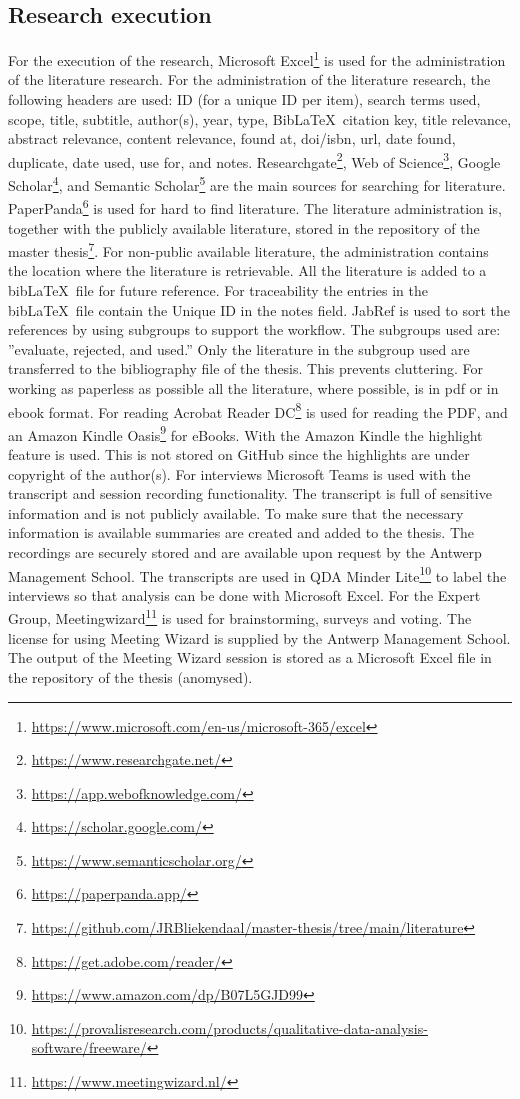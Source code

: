 \subsection{Research execution}
\label{sub:tbresearchexecution}
For the execution of the research, Microsoft Excel\footnote{\url{https://www.microsoft.com/en-us/microsoft-365/excel}} is used for the administration of the literature research. For the administration of the literature research, the following headers are used: ID (for a unique ID per item), search terms used, scope, title, subtitle, author(s), year, type, Bib\LaTeX\ citation key, title relevance, abstract relevance, content relevance, found at, doi/isbn, url, date found, duplicate, date used, use for, and notes. Researchgate\footnote{\url{https://www.researchgate.net/}}, Web of Science\footnote{\url{https://app.webofknowledge.com/}}, Google Scholar\footnote{\url{https://scholar.google.com/}}, and Semantic Scholar\footnote{\url{https://www.semanticscholar.org/}} are the main sources for searching for literature. PaperPanda\footnote{\url{https://paperpanda.app/}} is used for hard to find literature. The literature administration is, together with the publicly available literature, stored in the repository of the master thesis\footnote{\url{https://github.com/JRBliekendaal/master-thesis/tree/main/literature}}. For non-public available literature, the administration contains the location where the literature is retrievable. All the literature is added to a bib\LaTeX\ file for future reference. For traceability the entries in the bib\LaTeX\ file contain the Unique ID in the notes field. JabRef is used to sort the references by using subgroups to support the workflow. The subgroups used are: ''evaluate, rejected, and used.'' Only the literature in the subgroup used are transferred to the bibliography file of the thesis. This prevents cluttering. For working as paperless as possible all the literature, where possible, is in pdf or in ebook format. For reading Acrobat Reader DC\footnote{\url{https://get.adobe.com/reader/}} is used for reading the PDF, and an Amazon Kindle Oasis\footnote{\url{https://www.amazon.com/dp/B07L5GJD99}} for eBooks. With the Amazon Kindle the highlight feature is used. This is not stored on GitHub since the highlights are under copyright of the author(s). For interviews Microsoft Teams is used with the transcript and session recording functionality. The transcript is full of sensitive information and is not publicly available. To make sure that the necessary information is available summaries are created and added to the thesis. The recordings are securely stored and are available upon request by the Antwerp Management School. The transcripts are used in QDA Minder Lite\footnote{\url{https://provalisresearch.com/products/qualitative-data-analysis-software/freeware/}} to label the interviews so that analysis can be done with Microsoft Excel. For the Expert Group, Meetingwizard\footnote{\url{https://www.meetingwizard.nl/}} is used for brainstorming, surveys and voting. The license for using Meeting Wizard is supplied by the Antwerp Management School. The output of the Meeting Wizard session is stored as a Microsoft Excel file in the repository of the thesis (anomysed).
